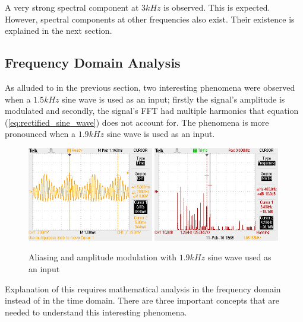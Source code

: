 \documentclass{article}
\begin{document}
A very strong spectral component at $3kHz$ is observed. This is expected. However, spectral components at other frequencies also exist. Their existence is explained in the next section.

\newpage
\subsection{Frequency Domain Analysis}

As alluded to in the previous section, two interesting phenomena were observed when a $1.5kHz$ sine wave is used as an input; firstly the signal's amplitude is modulated and secondly, the signal's FFT had multiple harmonics that equation (\ref{eq:rectified_sine_wave}) does not account for. The phenomena is more pronounced when a $1.9kHz$ sine wave is used as an input. 

\begin{figure}[H]
    \centering
    \includegraphics[width=0.49\textwidth]{ex1_3800Hz_output_cursor}
    \includegraphics[width=0.49\textwidth]{ex1_3800Hz_output_FFT}
    \caption{Aliasing and amplitude modulation with $1.9kHz$ sine wave used as an input}
\end{figure}


Explanation of this requires mathematical analysis in the frequency domain instead of in the time domain. There are three important concepts that are needed to understand this interesting phenomena.
\end{document}
